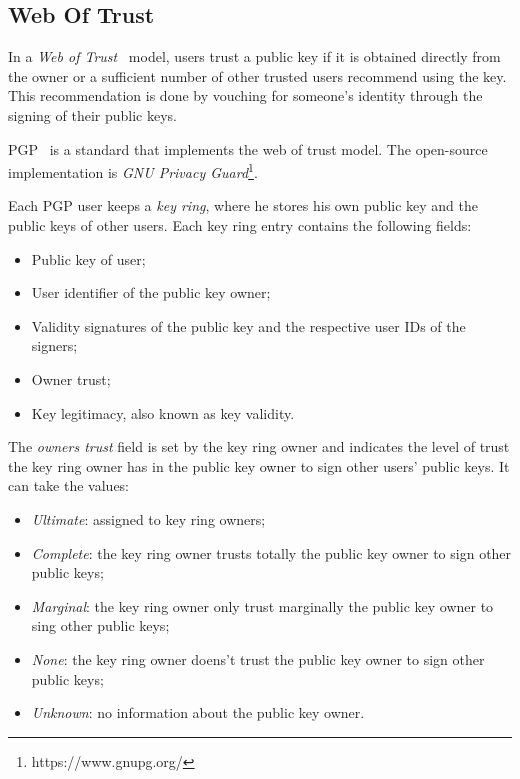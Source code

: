 \subsection{Web Of Trust}

In a \textit{Web of Trust}~\cite{Caronni2000} model, users trust a public key if it is obtained directly from the owner or a sufficient number of other trusted users recommend using the key.
This recommendation is done by vouching for someone's identity through the signing of their public keys.

\ac{PGP}~\cite{rfc4880} is a standard that implements the web of trust model.
The open-source implementation is \textit{GNU Privacy Guard}\footnote{https://www.gnupg.org/}.

Each \ac{PGP} user keeps a \textit{key ring}, where he stores his own public key and the public keys of other users.
Each key ring entry contains the following fields:
\begin{itemize}
	\item Public key of user;
	\item User identifier of the public key owner;
	\item Validity signatures of the public key and the respective user IDs of the signers;
	\item Owner trust;
	\item Key legitimacy, also known as key validity.
\end{itemize}

The \textit{owners trust} field is set by the key ring owner and indicates the level of trust the key ring owner has in the public key owner to sign other users' public keys.
It can take the values:

\begin{itemize}
	\item \textit{Ultimate}: assigned to key ring owners;
	\item \textit{Complete}: the key ring owner trusts totally the public key owner to sign other public keys;
	\item \textit{Marginal}: the key ring owner only trust marginally the public key owner to sing other public keys;
	\item \textit{None}: the key ring owner doens't trust the public key owner to sign other public keys;
	\item \textit{Unknown}: no information about the public key owner.
\end{itemize}

